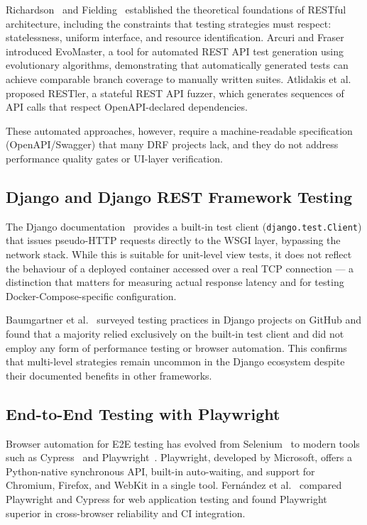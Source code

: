 \documentclass[12pt, a4paper]{article}
\begin{document}
Richardson~\cite{richardson2013} and Fielding~\cite{fielding2000} established
the theoretical foundations of RESTful architecture, including the constraints
that testing strategies must respect: statelessness, uniform interface, and
resource identification.  Arcuri and Fraser~\cite{arcuri2019} introduced
EvoMaster, a tool for automated REST API test generation using evolutionary
algorithms, demonstrating that automatically generated tests can achieve
comparable branch coverage to manually written suites.  Atlidakis et
al.~\cite{atlidakis2019} proposed RESTler, a stateful REST API fuzzer, which
generates sequences of API calls that respect OpenAPI-declared dependencies.

These automated approaches, however, require a machine-readable specification
(OpenAPI/Swagger) that many DRF projects lack, and they do not address
performance quality gates or UI-layer verification.

\subsection{Django and Django REST Framework Testing}

The Django documentation~\cite{django_docs} provides a built-in test client
(\texttt{django.test.Client}) that issues pseudo-HTTP requests directly to the
WSGI layer, bypassing the network stack.  While this is suitable for unit-level
view tests, it does not reflect the behaviour of a deployed container accessed
over a real TCP connection — a distinction that matters for measuring actual
response latency and for testing Docker-Compose-specific configuration.

Baumgartner et al.~\cite{baumgartner2020} surveyed testing practices in Django
projects on GitHub and found that a majority relied exclusively on the built-in
test client and did not employ any form of performance testing or browser
automation.  This confirms that multi-level strategies remain uncommon in the
Django ecosystem despite their documented benefits in other frameworks.

\subsection{End-to-End Testing with Playwright}

Browser automation for E2E testing has evolved from Selenium~\cite{selenium} to
modern tools such as Cypress~\cite{cypress} and
Playwright~\cite{playwright2020}.  Playwright, developed by Microsoft, offers a
Python-native synchronous API, built-in auto-waiting, and support for
Chromium, Firefox, and WebKit in a single tool.  Fern{\'a}ndez et
al.~\cite{fernandez2022} compared Playwright and Cypress for web application
testing and found Playwright superior in cross-browser reliability and CI
integration.
\end{document}
